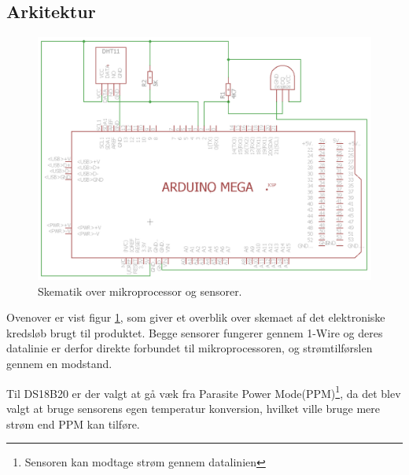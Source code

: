 \subsection{Arkitektur}

\begin{figure}[h!]
 \centering
 \includegraphics[width=1\textwidth]{figures/phase1_schematic.png}
 \caption{Skematik over mikroprocessor og sensorer.}
 \label{p1_skema}
\end{figure}

Ovenover er vist figur \ref{p1_skema}, som giver et overblik over skemaet af det elektroniske kredsløb brugt til produktet.
Begge sensorer fungerer gennem 1-Wire og deres datalinie er derfor direkte forbundet til mikroprocessoren, og strømtilførslen gennem en modstand.

Til DS18B20 er der valgt at gå væk fra Parasite Power Mode(PPM)\footnote{Sensoren kan modtage strøm gennem datalinien}, da det blev valgt at bruge sensorens egen temperatur konversion, hvilket ville bruge mere strøm end PPM kan tilføre.
